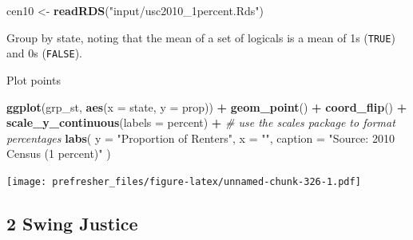 \documentclass[]{book}
\newenvironment{Shaded}{\begin{snugshade}}{\end{snugshade}}
\newcommand{\CommentTok}[1]{\textcolor[rgb]{0.56,0.35,0.01}{\textit{#1}}}
\newcommand{\DataTypeTok}[1]{\textcolor[rgb]{0.13,0.29,0.53}{#1}}
\newcommand{\KeywordTok}[1]{\textcolor[rgb]{0.13,0.29,0.53}{\textbf{#1}}}
\newcommand{\NormalTok}[1]{#1}
\newcommand{\OperatorTok}[1]{\textcolor[rgb]{0.81,0.36,0.00}{\textbf{#1}}}
\newcommand{\StringTok}[1]{\textcolor[rgb]{0.31,0.60,0.02}{#1}}
\theoremstyle{definition}
\theoremstyle{definition}
\theoremstyle{definition}
\theoremstyle{remark}
\begin{document}
\begin{Shaded}
\begin{Highlighting}[]
\NormalTok{cen10 <-}\StringTok{ }\KeywordTok{readRDS}\NormalTok{(}\StringTok{"input/usc2010_1percent.Rds"}\NormalTok{)}
\end{Highlighting}
\end{Shaded}

Group by state, noting that the mean of a set of logicals is a mean of 1s (\texttt{TRUE}) and 0s (\texttt{FALSE}).

\begin{Shaded}
\end{Shaded}

Plot points

\begin{Shaded}
\begin{Highlighting}[]
\KeywordTok{ggplot}\NormalTok{(grp_st, }\KeywordTok{aes}\NormalTok{(}\DataTypeTok{x =}\NormalTok{ state, }\DataTypeTok{y =}\NormalTok{ prop)) }\OperatorTok{+}
\StringTok{  }\KeywordTok{geom_point}\NormalTok{() }\OperatorTok{+}
\StringTok{  }\KeywordTok{coord_flip}\NormalTok{() }\OperatorTok{+}
\StringTok{  }\KeywordTok{scale_y_continuous}\NormalTok{(}\DataTypeTok{labels =}\NormalTok{ percent) }\OperatorTok{+}\StringTok{ }\CommentTok{# use the scales package to format percentages}
\StringTok{  }\KeywordTok{labs}\NormalTok{(}
    \DataTypeTok{y =} \StringTok{"Proportion of Renters"}\NormalTok{,}
    \DataTypeTok{x =} \StringTok{""}\NormalTok{,}
    \DataTypeTok{caption =} \StringTok{"Source: 2010 Census (1 percent)"}
\NormalTok{  )}
\end{Highlighting}
\end{Shaded}

\texttt{[image: prefresher\_files/figure-latex/unnamed-chunk-326-1.pdf]}

\hypertarget{swing-justice}{%
\subsection*{2 Swing Justice}\label{swing-justice}}
\end{document}
